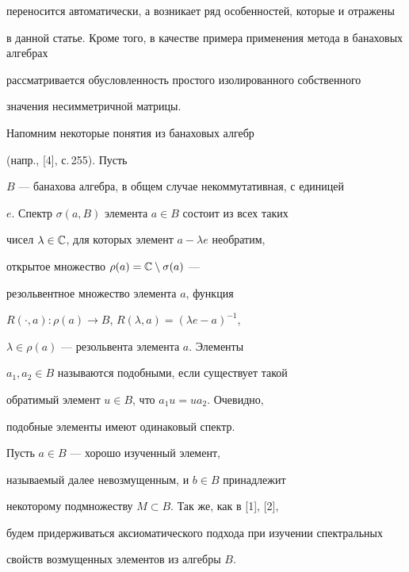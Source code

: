 переносится автоматически, а возникает ряд особенностей, которые и отражены


в данной статье. Кроме того, в качестве примера применения метода в банаховых алгебрах


рассматривается обусловленность простого изолированного собственного


значения несимметричной матрицы.





Напомним некоторые понятия из банаховых алгебр


(напр., [4], с.\,255). Пусть 


$B$ --- банахова алгебра, в общем случае некоммутативная, с единицей


$e$. Спектр $\sigma(a,B)$ элемента $a\in B$ состоит из  всех таких


чисел $\lambda\in\Bbb C$, для которых элемент $a-\lambda e$ необратим,


открытое множество $\rho(a)=\Bbb{C}\setminus\sigma(a)$ ---


резольвентное множество элемента $a$, функция


$R(\cdot,a):\rho(a)\to B$, $R(\lambda,a)=(\lambda e-a)^{-1}$,


$\lambda\in\rho(a)$ --- резольвента элемента $a$. Элементы


$a_1,a_2\in B$ называются подобными, если существует такой


обратимый элемент $u\in B$, что $a_1u=ua_2$. Очевидно,


подобные элементы имеют одинаковый спектр.





Пусть $a\in B$ --- хорошо изученный элемент, 


называемый далее невозмущенным, и $b\in B$ принадлежит 


некоторому подмножеству $M\subset B$. Так же, как в [1], [2],


будем придерживаться аксиоматического подхода при изучении спектральных


свойств возмущенных элементов из алгебры $B$.








